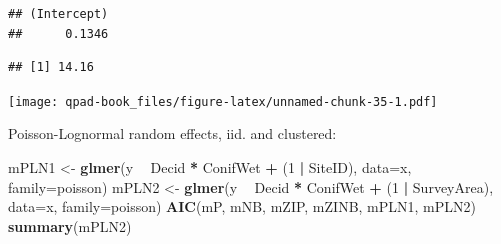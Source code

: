 \documentclass[12pt,]{book}
\newenvironment{Shaded}{\begin{snugshade}}{\end{snugshade}}
\newcommand{\CommentTok}[1]{\textcolor[rgb]{0.56,0.35,0.01}{\textit{#1}}}
\newcommand{\DataTypeTok}[1]{\textcolor[rgb]{0.13,0.29,0.53}{#1}}
\newcommand{\DecValTok}[1]{\textcolor[rgb]{0.00,0.00,0.81}{#1}}
\newcommand{\FloatTok}[1]{\textcolor[rgb]{0.00,0.00,0.81}{#1}}
\newcommand{\KeywordTok}[1]{\textcolor[rgb]{0.13,0.29,0.53}{\textbf{#1}}}
\newcommand{\NormalTok}[1]{#1}
\newcommand{\OperatorTok}[1]{\textcolor[rgb]{0.81,0.36,0.00}{\textbf{#1}}}
\newcommand{\StringTok}[1]{\textcolor[rgb]{0.31,0.60,0.02}{#1}}
\begin{document}
\begin{verbatim}
## (Intercept) 
##      0.1346
\end{verbatim}

\begin{Shaded}
\end{Shaded}

\begin{verbatim}
## [1] 14.16
\end{verbatim}

\begin{Shaded}
\end{Shaded}

\texttt{[image: qpad-book\_files/figure-latex/unnamed-chunk-35-1.pdf]}

Poisson-Lognormal random effects, iid. and clustered:

\begin{Shaded}
\begin{Highlighting}[]
\NormalTok{mPLN1 <-}\StringTok{ }\KeywordTok{glmer}\NormalTok{(y }\OperatorTok{~}\StringTok{ }\NormalTok{Decid }\OperatorTok{*}\StringTok{ }\NormalTok{ConifWet }\OperatorTok{+}\StringTok{ }\NormalTok{(}\DecValTok{1} \OperatorTok{|}\StringTok{ }\NormalTok{SiteID), }\DataTypeTok{data=}\NormalTok{x, }\DataTypeTok{family=}\NormalTok{poisson)}
\NormalTok{mPLN2 <-}\StringTok{ }\KeywordTok{glmer}\NormalTok{(y }\OperatorTok{~}\StringTok{ }\NormalTok{Decid }\OperatorTok{*}\StringTok{ }\NormalTok{ConifWet }\OperatorTok{+}\StringTok{ }\NormalTok{(}\DecValTok{1} \OperatorTok{|}\StringTok{ }\NormalTok{SurveyArea), }\DataTypeTok{data=}\NormalTok{x, }\DataTypeTok{family=}\NormalTok{poisson)}
\KeywordTok{AIC}\NormalTok{(mP, mNB, mZIP, mZINB, mPLN1, mPLN2)}
\KeywordTok{summary}\NormalTok{(mPLN2)}
\end{Highlighting}
\end{Shaded}
\end{document}
